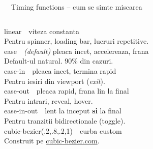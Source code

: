 \documentclass[aspectratio=169,11pt]{beamer}
\newcommand{\code}[1]{{\ttfamily\small\color{accent!85!black}#1}}
\begin{document}
\begin{frame}{\textcolor{themeCss}{\faPaintBrush}\ \ Timing functions -- cum se simte miscarea}
\begin{columns}[T,onlytextwidth]
{\footnotesize
\code{linear} \,\textendash\, viteza constanta\\
{\scriptsize\color{textDim}\quad Pentru spinner, loading bar, lucruri repetitive.}\\[3pt]

\code{ease} \,\textendash\, \emph{(default)} pleaca incet, accelereaza, frana\\
{\scriptsize\color{textDim}\quad Default-ul natural. 90\% din cazuri.}\\[3pt]

\code{ease-in} \,\textendash\, pleaca incet, termina rapid\\
{\scriptsize\color{textDim}\quad Pentru iesiri din viewport (\emph{exit}).}\\[3pt]

\code{ease-out} \,\textendash\, pleaca rapid, frana lin la final\\
{\scriptsize\color{textDim}\quad Pentru intrari, reveal, hover.}\\[3pt]

\code{ease-in-out} \,\textendash\, lent la inceput \textbf{si} la final\\
{\scriptsize\color{textDim}\quad Pentru tranzitii bidirectionale (toggle).}\\[3pt]

\code{cubic-bezier(.2,.8,.2,1)} \,\textendash\, curba custom\\
{\scriptsize\color{textDim}\quad Construit pe \href{https://cubic-bezier.com}{cubic-bezier.com}.}
}


\end{columns}
\end{frame}
\end{document}
